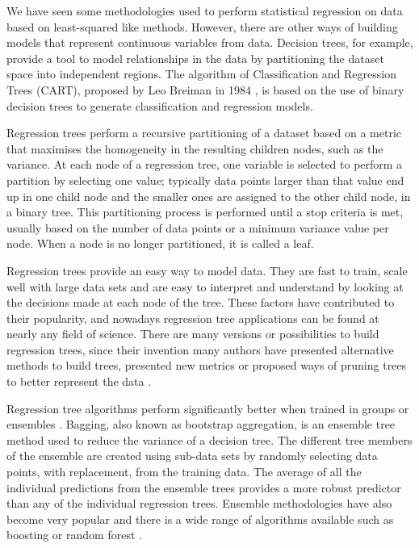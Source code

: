 \medskip

We have seen some methodologies used to perform statistical regression on data based on least-squared like methods. However, there are other ways of building models that represent continuous variables from data. Decision trees, for example, provide a tool to model relationships in the data by partitioning the dataset space into independent regions. The algorithm of Classification and Regression Trees (CART), proposed by Leo Breiman in 1984 \citep{breiman2017classification}, is based on the use of binary decision trees to generate classification and regression models. 

\medskip

Regression trees perform a recursive partitioning of a dataset based on a metric that maximises the homogeneity in the resulting children nodes, such as the variance. At each node of a regression tree, one variable is selected to perform a partition by selecting one value; typically data points larger than that value end up in one child node and the smaller ones are assigned to the other child node, in a binary tree. This partitioning process is performed until a stop criteria is met, usually based on the number of data points or a minimum variance value per node. When a node is no longer partitioned, it is called a leaf.

\medskip

Regression trees provide an easy way to model data. They are fast to train, scale well with large data sets and are easy to interpret and understand by looking at the decisions made at each node of the tree. These factors have contributed to their popularity, and nowadays regression tree applications can be found at nearly any field of science. There are many versions or possibilities to build regression trees, since their invention many authors have presented alternative methods to build trees, presented new metrics or proposed ways of pruning trees to better represent the data \citep{quinlan2014c4,freund1999alternating}. 

\medskip

Regression tree algorithms perform significantly better when trained in groups or ensembles \citep{breiman1996bagging}. Bagging, also known as bootstrap aggregation, is an ensemble tree method used to reduce the variance of a decision tree. The different tree members of the ensemble are created using sub-data sets by randomly selecting data points, with replacement, from the training data. The average of all the individual predictions from the ensemble trees provides a more robust predictor than any of the individual regression trees. Ensemble methodologies have also become very popular and there is a wide range of algorithms available such as boosting or random forest \citep{dietterich2000experimental,breiman2001random}.

